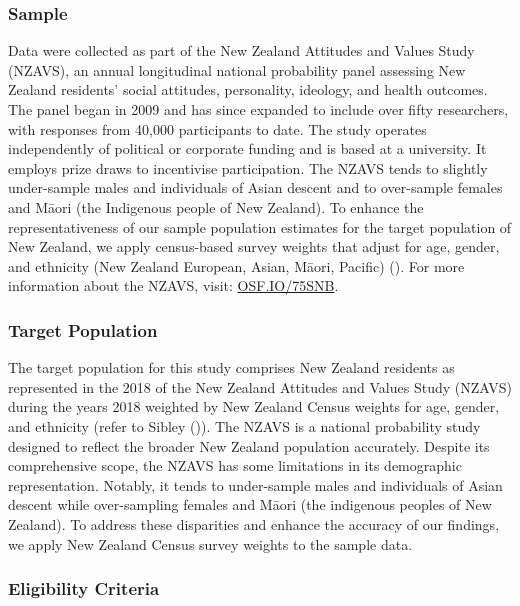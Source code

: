 \documentclass[
  single column]{article}
\begin{document}
\subsubsection{Sample}\label{sample}

Data were collected as part of the New Zealand Attitudes and Values
Study (NZAVS), an annual longitudinal national probability panel
assessing New Zealand residents' social attitudes, personality,
ideology, and health outcomes. The panel began in 2009 and has since
expanded to include over fifty researchers, with responses from 40,000
participants to date. The study operates independently of political or
corporate funding and is based at a university. It employs prize draws
to incentivise participation. The NZAVS tends to slightly under-sample
males and individuals of Asian descent and to over-sample females and
Māori (the Indigenous people of New Zealand). To enhance the
representativeness of our sample population estimates for the target
population of New Zealand, we apply census-based survey weights that
adjust for age, gender, and ethnicity (New Zealand European, Asian,
Māori, Pacific) (). For more
information about the NZAVS, visit:
\href{https://doi.org/10.17605/OSF.IO/75SNB}{OSF.IO/75SNB}.

\subsubsection{Target Population}\label{target-population}

The target population for this study comprises New Zealand residents as
represented in the 2018 of the New Zealand Attitudes and Values Study
(NZAVS) during the years 2018 weighted by New Zealand Census weights for
age, gender, and ethnicity (refer to Sibley
()). The NZAVS is a national probability
study designed to reflect the broader New Zealand population accurately.
Despite its comprehensive scope, the NZAVS has some limitations in its
demographic representation. Notably, it tends to under-sample males and
individuals of Asian descent while over-sampling females and Māori (the
indigenous peoples of New Zealand). To address these disparities and
enhance the accuracy of our findings, we apply New Zealand Census survey
weights to the sample data.

\subsubsection{Eligibility Criteria}\label{eligibility-criteria}
\end{document}
